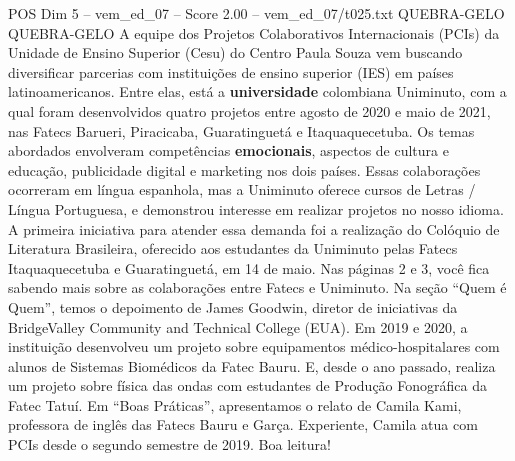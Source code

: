 \begin{textsample}{POS Dim 5 – vem\_ed\_07 – Score 2.00 – vem\_ed\_07/t025.txt}  \label{ex:f5_pos_153}
QUEBRA-GELO QUEBRA-GELO A equipe dos Projetos Colaborativos Internacionais (PCIs) da Unidade de Ensino Superior (Cesu) do Centro Paula Souza vem buscando diversificar parcerias com instituições de ensino superior (IES) em países latinoamericanos.
Entre elas, está a \textbf{universidade} colombiana Uniminuto, com a qual foram desenvolvidos quatro projetos entre agosto de 2020 e maio de 2021, nas Fatecs Barueri, Piracicaba, Guaratinguetá e Itaquaquecetuba.
Os temas abordados envolveram competências \textbf{emocionais}, aspectos de cultura e educação, publicidade digital e marketing nos dois países.
Essas colaborações ocorreram em língua espanhola, mas a Uniminuto oferece cursos de Letras / Língua Portuguesa, e demonstrou interesse em realizar projetos no nosso idioma.
A primeira iniciativa para atender essa demanda foi a realização do Colóquio de Literatura Brasileira, oferecido aos estudantes da Uniminuto pelas Fatecs Itaquaquecetuba e Guaratinguetá, em 14 de maio.
Nas páginas 2 e 3, você fica sabendo mais sobre as colaborações entre Fatecs e Uniminuto.
Na seção “Quem é Quem”, temos o depoimento de James Goodwin, diretor de iniciativas da BridgeValley Community and Technical College (EUA).
Em 2019 e 2020, a instituição desenvolveu um projeto sobre equipamentos médico-hospitalares com alunos de Sistemas Biomédicos da Fatec Bauru.
E, desde o ano passado, realiza um projeto sobre física das ondas com estudantes de Produção Fonográfica da Fatec Tatuí.
Em “Boas Práticas”, apresentamos o relato de Camila Kami, professora de inglês das Fatecs Bauru e Garça.
Experiente, Camila atua com PCIs desde o segundo semestre de 2019.
Boa leitura!

\end{textsample}
